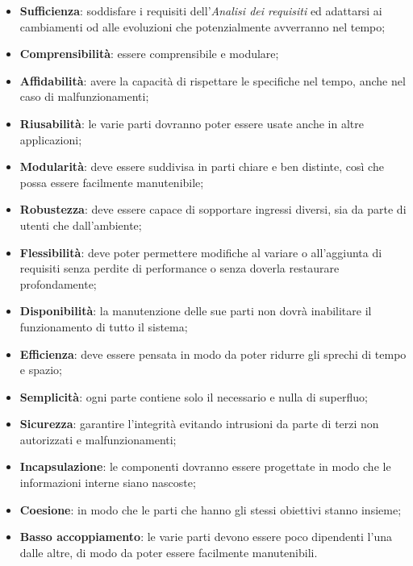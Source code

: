 \begin{itemize}
	\item \textbf{Sufficienza}: soddisfare i requisiti dell’\emph{Analisi dei requisiti} ed adattarsi ai cambiamenti od alle evoluzioni che potenzialmente avverranno nel tempo;
	\item \textbf{Comprensibilità}: essere comprensibile e modulare;
	\item \textbf{Affidabilità}: avere la capacità di rispettare le specifiche nel tempo, anche nel caso di malfunzionamenti;
	\item \textbf{Riusabilità}: le varie parti dovranno poter essere usate anche in altre applicazioni;
	\item \textbf{Modularità}: deve essere suddivisa in parti chiare e ben distinte, così che possa essere facilmente manutenibile;
	\item \textbf{Robustezza}: deve essere capace di sopportare ingressi diversi, sia da parte di utenti che dall'ambiente;
	\item \textbf{Flessibilità}: deve poter permettere modifiche al variare o all'aggiunta di requisiti senza perdite di performance o senza doverla restaurare profondamente;
	\item \textbf{Disponibilità}: la manutenzione delle sue parti non dovrà inabilitare il funzionamento di tutto il sistema;
	\item \textbf{Efficienza}: deve essere pensata in modo da poter ridurre gli sprechi di
	tempo e spazio;
	\item \textbf{Semplicità}: ogni parte contiene solo il necessario e nulla di superfluo;
	\item \textbf{Sicurezza}: garantire l'integrità evitando intrusioni da parte di terzi non autorizzati e malfunzionamenti;
	\item \textbf{Incapsulazione}: le componenti dovranno essere progettate in modo che le
	informazioni interne siano nascoste;
	\item \textbf{Coesione}: in modo che le parti che hanno gli stessi obiettivi stanno insieme;
	\item \textbf{Basso accoppiamento}: le varie parti devono essere poco dipendenti l'una dalle altre, di modo da poter essere facilmente manutenibili.
\end{itemize}
